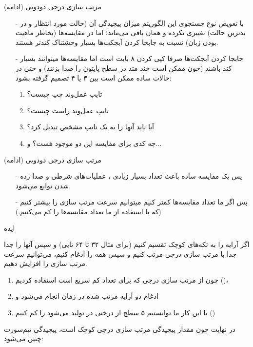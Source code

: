 \begin{frame}{مرتب‌ سازی درجی دودویی (ادامه)}
\begin{itemize}\itemr
\item[-]
با تعویض نوع جستجوی‌ این الگوریتم میزان پیچیدگی آن (حالت مورد انتظار و در بدترین حالت) تغییری نکرده و همان
باقی می‌ماند؛ اما در 
مقایسه‌ها (بخاطر ماهیت  بودن زبان) نسبت به جابجا کردن آبجکت‌ها بسیار وحشتناک کند‌تر هستند.
\item[-]
جابجا کردن آبجکت‌ها صرفا کپی کردن ۸ بایت  است اما مقایسه‌ها میتوانند بسیار کند باشند (چون ممکن است چند متد در سطح پایتون را صدا بزنند) و حتی در حالات ساده ممکن است بین ۳ یا ۴ تصمیم گرفته بشود: 

\begin{enumerate}\itemr
\item 
تایپ عمل‌وند چپ چیست؟
\item 
تایپ عمل‌وند راست چیست؟
\item 
آیا باید آنها را به یک تایپ مشخص تبدیل کرد؟
\item 
چه کدی برای مقایسه این دو موجود هست؟ و...
\end{enumerate}
\end{itemize}
\end{frame}

\begin{frame}{مرتب سازی درجی دودویی (ادامه)}
\begin{itemize}\itemr
\item[-]
پس یک مقایسه ساده باعث تعداد بسیار زیادی ، عملیات‌های شرطی و صدا زده شدن توابع می‌شود.

\item[-]
پس اگر ما تعداد مقایسه‌ها کمتر کنیم میتوانیم سرعت مرتب سازی را بیشتر کنیم (که با استفاده از  ما تعداد مقایسه‌ها را کم می‌کنیم.)
\end{itemize}
\end{frame}

\begin{frame}{ایده}
\begin{center}
{\large اگر آرایه را به تکه‌های کوچک تقسیم کنیم‌ (برای مثال ۳۲ تا ۶۴ تایی) و سپس آنها را جدا جدا با مرتب‌ سازی درجی مرتب کنیم و سپس همه را ادغام کنیم، می‌توانیم سرعت مرتب سازی را افزایش دهیم.}
\end{center}

\begin{enumerate}\itemr
\item
چون از مرتب سازی درجی که برای تعداد کم سریع است استفاده کردیم ()،
\item
ادغام دو آرایه مرتب شده در زمان 
انجام می‌شود و

\item 
با این کار ما توانستیم ۵ سطح از درختی در  تولید می‌شود را کم کنیم ()
\end{enumerate}

\begin{center}
{\large در نهایت چون مقدار پیچیدگی مرتب سازی درجی کوچک است، پیچیدگی  تیم‌سورت چنین می‌شود: }
\end{center}
\end{frame}

